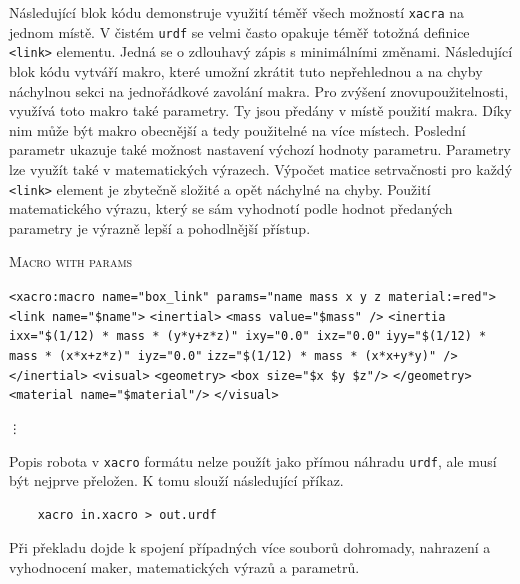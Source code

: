 Následující blok kódu demonstruje využití téměř všech možností \verb|xacra| na jednom místě.
V čistém \verb|urdf| se velmi často opakuje téměř totožná definice \verb|<link>| elementu. Jedná se o zdlouhavý zápis s minimálními změnami. Následující blok kódu vytváří makro, které umožní zkrátit tuto nepřehlednou a na chyby náchylnou sekci na jednořádkové zavolání makra. Pro zvýšení znovupoužitelnosti, využívá toto makro také parametry. Ty jsou předány v místě použití makra. Díky nim může být makro obecnější a tedy použitelné na více místech. Poslední parametr ukazuje také možnost nastavení výchozí hodnoty parametru. Parametry lze využít také v matematických výrazech. Výpočet matice setrvačnosti pro každý \verb|<link>| element je zbytečně složité a opět náchylné na chyby. Použití matematického výrazu, který se sám vyhodnotí podle hodnot předaných parametry je výrazně lepší a pohodlnější přístup.

\begin{algorithm}[h!]
	\label{}
	\caption{\textsc{Macro with params}}
	
	\DontPrintSemicolon
	\SetAlgoNoLine
	\SetNlSty{}{}{:}
	\SetNlSkip{-1.1em}
	
	\BlankLine \Indp\Indpp
	
	\texttt{<xacro:macro name="box\_link" params="name mass x y z material:=red">}\;
	\Indp\Indp
	\texttt{<link name="\${name}">}\;
	\Indp\Indp
	\texttt{<inertial>}\;
	\Indp\Indp
	\texttt{<mass value="\${mass}" />}\;
	\texttt{<inertia ixx="\${(1/12) * mass * (y*y+z*z)}" ixy="0.0" ixz="0.0"}\;
	\Indp\Indp
	\texttt{iyy="\${(1/12) * mass * (x*x+z*z)}" iyz="0.0"}\;
	\texttt{izz="\${(1/12) * mass * (x*x+y*y)}" />}\;
	\Indm\Indm
	\Indm\Indm
	\texttt{</inertial>}\;
	\texttt{<visual>}\;
	\Indp\Indp
	\texttt{<geometry>}\;	
	\Indp\Indp
	\texttt{<box size="\${x} \${y} \${z}"/>}\;
	\Indm\Indm
	\texttt{</geometry>}\;
	\texttt{<material name="\${material}"/>}\;
	\Indm\Indm
	\texttt{</visual>}\;
    \begin{center}
	\texttt{\vdots}
	\end{center}
	
\end{algorithm}

Popis robota v \verb|xacro| formátu nelze použít jako přímou náhradu \verb|urdf|, ale musí být nejprve přeložen. K tomu slouží následující příkaz.
\begin{verbatim}
	xacro in.xacro > out.urdf
\end{verbatim}
Při překladu dojde k spojení případných více souborů dohromady, nahrazení a vyhodnocení maker, matematických výrazů a parametrů.

